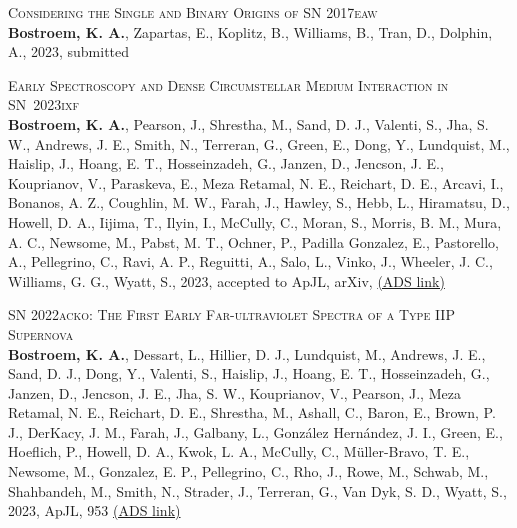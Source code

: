 \begin{revnumerate}[5]
\item{\textsc{Considering the Single and Binary Origins of SN 2017eaw}\\ 
\textbf{Bostroem, K. A.}, Zapartas, E., Koplitz, B., Williams, B., Tran, D., Dolphin, A., 2023, submitted}\\

\item{\textsc{Early Spectroscopy and Dense Circumstellar Medium Interaction in SN~2023ixf}\\ 
\textbf{Bostroem, K. A.}, Pearson, J., Shrestha, M., Sand, D. J., Valenti, S., Jha, S. W., Andrews, J. E., Smith, N., Terreran, G., Green, E., Dong, Y., Lundquist, M., Haislip, J., Hoang, E. T., Hosseinzadeh, G., Janzen, D., Jencson, J. E., Kouprianov, V., Paraskeva, E., Meza Retamal, N. E., Reichart, D. E., Arcavi, I., Bonanos, A. Z., Coughlin, M. W., Farah, J., Hawley, S., Hebb, L., Hiramatsu, D., Howell, D. A., Iijima, T., Ilyin, I., McCully, C., Moran, S., Morris, B. M., Mura, A. C., Newsome, M., Pabst, M. T., Ochner, P., Padilla Gonzalez, E., Pastorello, A., Pellegrino, C., Ravi, A. P., Reguitti, A., Salo, L., Vinko, J., Wheeler, J. C., Williams, G. G., Wyatt, S., 2023, accepted to ApJL, arXiv, 
\color{blue}\href{https://ui.adsabs.harvard.edu/abs/2023arXiv230610119B}{(ADS link)}\color{black}}\\

\item{\textsc{SN 2022acko: The First Early Far-ultraviolet Spectra of a Type IIP Supernova}\\ 
\textbf{Bostroem, K. A.}, Dessart, L., Hillier, D. J., Lundquist, M., Andrews, J. E., Sand, D. J., Dong, Y., Valenti, S., Haislip, J., Hoang, E. T., Hosseinzadeh, G., Janzen, D., Jencson, J. E., Jha, S. W., Kouprianov, V., Pearson, J., Meza Retamal, N. E., Reichart, D. E., Shrestha, M., Ashall, C., Baron, E., Brown, P. J., DerKacy, J. M., Farah, J., Galbany, L., González Hernández, J. I., Green, E., Hoeflich, P., Howell, D. A., Kwok, L. A., McCully, C., Müller-Bravo, T. E., Newsome, M., Gonzalez, E. P., Pellegrino, C., Rho, J., Rowe, M., Schwab, M., Shahbandeh, M., Smith, N., Strader, J., Terreran, G., Van Dyk, S. D., Wyatt, S., 2023, ApJL, 953 
\color{blue}\href{https://ui.adsabs.harvard.edu/abs/2023ApJ...953L..18B}{(ADS link)}\color{black}}\\


\end{revnumerate}
